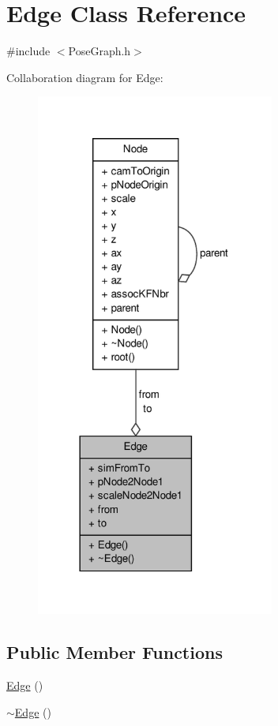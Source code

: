 \hypertarget{classEdge}{\section{\-Edge \-Class \-Reference}
\label{classEdge}
}


{\ttfamily \#include $<$\-Pose\-Graph.\-h$>$}



\-Collaboration diagram for \-Edge\-:\nopagebreak
\begin{figure}[H]
\begin{center}
\leavevmode
\includegraphics[width=222pt]{classEdge__coll__graph}
\end{center}
\end{figure}
\subsection*{\-Public \-Member \-Functions}
\begin{DoxyCompactItemize}
\item 
\hyperlink{classEdge_a3106b11d60125009dbf7a738ce540fdf}{\-Edge} ()
\item 
\hyperlink{classEdge_a2f37b72f044427961d6730943daf10e0}{$\sim$\-Edge} ()
\end{DoxyCompactItemize}
